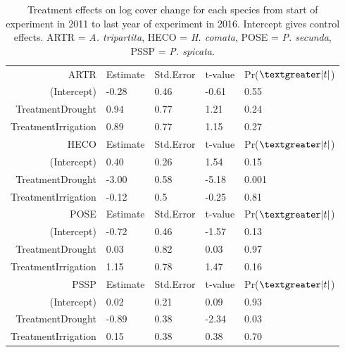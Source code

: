 \begin{table}[ht]
\centering
\caption{Treatment effects on log cover change for each species from start of experiment in 2011 to last year of experiment in 2016. Intercept gives control effects. ARTR = \textit{A. tripartita}, HECO = \textit{H. comata}, POSE = \textit{P. secunda}, PSSP = \textit{P. spicata}.} 
\label{table:coverChange}
\begin{tabular}{rllll}
	
  \hline
ARTR & Estimate & Std.Error & t-value & Pr($\textgreater \lvert t \rvert $)   \\ 
  (Intercept) & -0.28 & 0.46 & -0.61 & 0.55 \\ 
  TreatmentDrought & 0.94 & 0.77 & 1.21 & 0.24 \\ 
  TreatmentIrrigation & 0.89 & 0.77 & 1.15 & 0.27 \\
  \hline 
HECO & Estimate & Std.Error & t-value & Pr($\textgreater \lvert t \rvert $) \\ 
  (Intercept) & 0.40 & 0.26 & 1.54 & 0.15 \\ 
  TreatmentDrought & -3.00 & 0.58 & -5.18 & 0.001 \\ 
  TreatmentIrrigation & -0.12 & 0.5 & -0.25 & 0.81 \\ 
    \hline 
  
POSE & Estimate & Std.Error & t-value & Pr($\textgreater \lvert t \rvert $) \\ 
  (Intercept) & -0.72 & 0.46 & -1.57 & 0.13 \\ 
  TreatmentDrought & 0.03 & 0.82 & 0.03 & 0.97 \\ 
  TreatmentIrrigation & 1.15 & 0.78 & 1.47 & 0.16 \\ 
    \hline 
  
PSSP & Estimate & Std.Error & t-value & Pr($\textgreater \lvert t \rvert $) \\ 
  (Intercept) & 0.02 & 0.21 & 0.09 & 0.93 \\ 
  TreatmentDrought & -0.89 & 0.38 & -2.34 & 0.03 \\ 
  TreatmentIrrigation & 0.15 & 0.38 & 0.38 & 0.70 \\ 
   \hline
   
\end{tabular}
\end{table}

